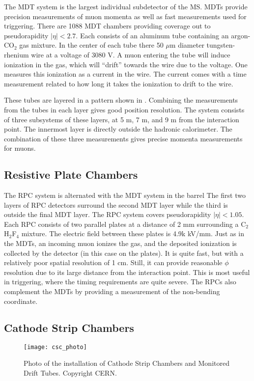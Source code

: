 The MDT system is the largest individual subdetector of the MS.
MDTs provide precision measurements of muon momenta as well as fast measurements used for triggering.
There are 1088 MDT chambers providing coverage out to pseudorapidity $|\eta| < 2.7 $.
Each consists of an aluminum tube containing an argon-CO$_2$ gas mixture.
In the center of each tube there 50 $\mu$m diameter tungsten-rhenium wire at a voltage of 3080 V.
A muon entering the tube will induce ionization in the gas, which will ``drift'' towards the wire due to the voltage.
One measures this ionization as a current in the wire.
The current comes with a time measurement related to how long it takes the ionization to drift to the wire.

These tubes are layered in a pattern shown in .
Combining the measurements from the tubes in each layer gives good position resolution.
The system consists of three subsystems of these layers, at 5 m, 7 m, and 9 m from the interaction point.
The innermost layer is directly outside the hadronic calorimeter.
The combination of these three measurements gives precise momenta measurements for muons.

\subsection{Resistive Plate Chambers}

The RPC system is alternated with the MDT system in the barrel
The first two layers of RPC detectors surround the second MDT layer while the third is outside the final MDT layer.
The RPC system covers pseudorapidity $|\eta| < 1.05 $.
Each RPC consists of two parallel plates at a distance of 2 mm surrounding a C$_2$H$_2$F$_4$ mixture.
The electric field between these plates is 4.9k kV/mm.
Just as in the MDTs, an incoming muon ionizes the gas, and the deposited ionization is collected by the detector (in this case on the plates).
It is quite fast, but with a relatively poor spatial resolution of 1 cm.
Still, it can provide reasonable $\phi$ resolution due to its large distance from the interaction point.
This is most useful in triggering, where the timing requirements are quite severe.
The RPCs also complement the MDTs by providing a measurement of the non-bending coordinate.

\subsection{Cathode Strip Chambers}
\begin{figure}[tbp]
\caption{Photo of the installation of Cathode Strip Chambers and Monitored Drift Tubes. Copyright CERN.} \label{fig:csc_photo}
\texttt{[image: csc\_photo]}
\end{figure}

